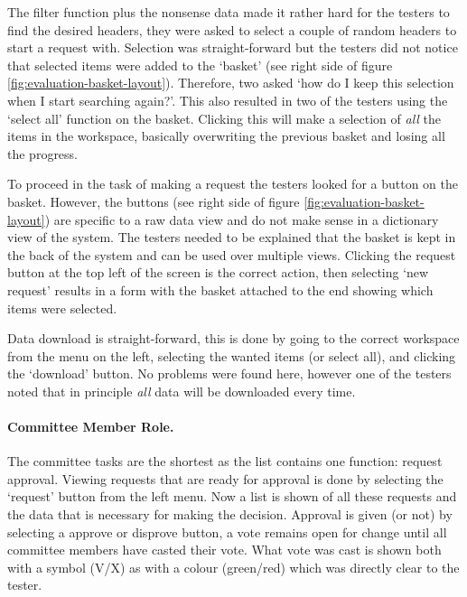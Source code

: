 The filter function plus the nonsense data made it rather hard for the testers to find the desired headers, they were asked to select a couple of random headers to start a request with.
Selection was straight-forward but the testers did not notice that selected items were added to the `basket' (see right side of figure \ref{fig:evaluation-basket-layout}).
Therefore, two asked `how do I keep this selection when I start searching again?'.
This also resulted in two of the testers using the `select all' function on the basket. 
Clicking this will make a selection of \emph{all} the items in the workspace, basically overwriting the previous basket and losing all the progress.

To proceed in the task of making a request the testers looked for a button on the basket.
However, the buttons (see right side of figure \ref{fig:evaluation-basket-layout}) are specific to a raw data view and do not make sense in a dictionary view of the system.
The testers needed to be explained that the basket is kept in the back of the system and can be used over multiple views.
Clicking the request button at the top left of the screen is the correct action, then selecting `new request' results in a form with the basket attached to the end showing which items were selected.

Data download is straight-forward, this is done by going to the correct workspace from the menu on the left, selecting the wanted items (or select all), and clicking the `download' button.
No problems were found here, however one of the testers noted that in principle \emph{all} data will be downloaded every time.

\paragraph{Committee Member Role.}
The committee tasks are the shortest as the list contains one function: request approval. 
Viewing requests that are ready for approval is done by selecting the `request' button from the left menu.
Now a list is shown of all these requests and the data that is necessary for making the decision.
Approval is given (or not) by selecting a approve or disprove button, a vote remains open for change until all committee members have casted their vote.
What vote was cast is shown both with a symbol (V/X) as with a colour (green/red) which was directly clear to the tester.

